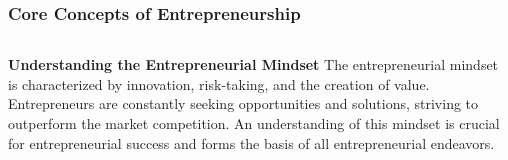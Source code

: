 \documentclass[5pt]{beamer}
\begin{document}
\begin{frame}
\frametitle{Core Concepts of Entrepreneurship}
\begin{columns}
\begin{column}{0.7\textwidth}
\begin{block}{\textbf{Understanding the Entrepreneurial Mindset}}
The entrepreneurial mindset is characterized by innovation, risk-taking, and the creation of value. Entrepreneurs are constantly seeking opportunities and solutions, striving to outperform the market competition. An understanding of this mindset is crucial for entrepreneurial success and forms the basis of all entrepreneurial endeavors.
\end{block}
\end{column}
\end{columns}
\end{frame}
\end{document}
